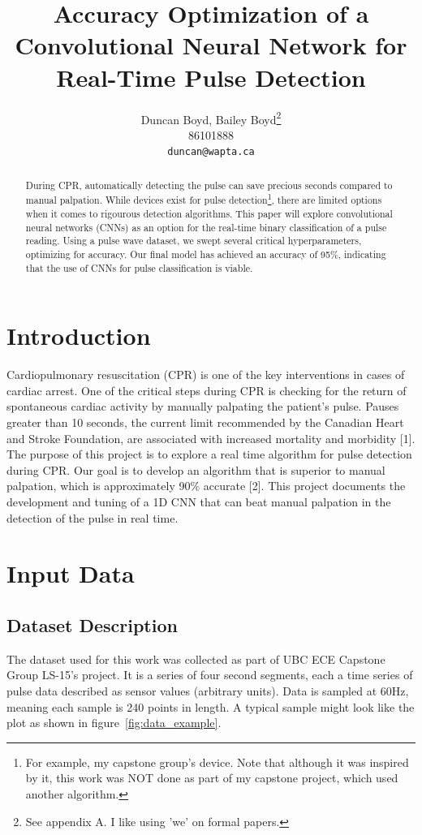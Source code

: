 \documentclass{article}
\title{Accuracy Optimization of a Convolutional Neural Network for Real-Time Pulse Detection}
\author{
  Duncan Boyd, Bailey Boyd\thanks{See appendix A. I like using 'we' on formal papers.} \\
  86101888 \\
  \texttt{duncan@wapta.ca} \\
}
\begin{document}
\maketitle


\begin{abstract}
  During CPR, automatically detecting the pulse can save precious seconds compared to manual palpation. While devices exist for pulse detection\footnote{For example, my capstone group's device. Note that although it was inspired by it, this work was NOT done as part of my capstone project, which used another algorithm.}, there are limited options when it comes to rigourous detection algorithms. This paper will explore convolutional neural networks (CNNs) as an option for the real-time binary classification of a pulse reading. Using a pulse wave dataset, we swept several critical hyperparameters, optimizing for accuracy. Our final model has achieved an accuracy of 95\%, indicating that the use of CNNs for pulse classification is viable.
\end{abstract}

\section{Introduction}

Cardiopulmonary resuscitation (CPR) is one of the key interventions in cases of cardiac arrest. One of the critical steps during CPR is checking for the return of spontaneous cardiac activity by manually palpating the patient's pulse. Pauses greater than 10 seconds, the current limit recommended by the Canadian Heart and Stroke Foundation, are associated with increased mortality and morbidity [1]. The purpose of this project is to explore a real time algorithm for pulse detection during CPR. Our goal is to develop an algorithm that is superior to manual palpation, which is approximately 90\% accurate [2]. This project documents the development and tuning of a 1D CNN that can beat manual palpation in the detection of the pulse in real time.

\section{Input Data}

\subsection{Dataset Description}

The dataset used for this work was collected as part of UBC ECE Capstone Group LS-15's project. It is a series of four second segments, each a time series of pulse data described as sensor values (arbitrary units). Data is sampled at 60Hz, meaning each sample is 240 points in length. A typical sample might look like the plot as shown in figure~\ref{fig:data_example}.
\end{document}
